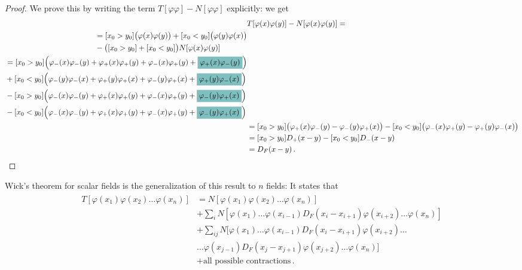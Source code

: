 \documentclass[main.tex]{subfiles}
\begin{document}
\begin{proof}
We prove this by writing the term \(T[\varphi \varphi ] - N[ \varphi \varphi ]\) explicitly: we get 
%
\begin{align}
& T[\varphi (x)\varphi (y)] - N[\varphi (x) \varphi (y)] = \\
\begin{split}
&= [x_0 > y_0 ] \qty(\varphi (x) \varphi (y)) + [x_0 < y_0 ] \qty(\varphi (y) \varphi (x)) \\
& 
- \qty([x_0 > y_0 ] + [x_0 < y_0 ]) N [\varphi (x)\varphi (y)] 
\end{split}  \\
\begin{split}
&= 
[x_0 > y_0 ] \qty(\varphi_{-} (x) \varphi_{-} (y) + \varphi_{+} (x) \varphi_{+} (y) + \varphi_{-} (x) \varphi_{+} (y) + \hlc{teal}{\varphi_{+} (x) \varphi_{-} (y)}) \\
& 
+ 
[x_0 < y_0 ] \qty(\varphi_{-} (y) \varphi_{-} (x) + \varphi_{+} (y) \varphi_{+} (x) + \varphi_{-} (y) \varphi_{+} (x) + \hlc{teal}{\varphi_{+} (y) \varphi_{-} (x)}) 
\\
& 
-
[x_0 > y_0 ]
\qty(\varphi_{-} (x) \varphi_{-} (y) + \varphi_{+} (x) \varphi_{+} (y) + \varphi_{-} (x) \varphi_{+} (y) + \hlc{teal}{\varphi_{-} (y) \varphi_{+} (x)} ) 
\\
& 
-
[x_0 < y_0 ]
\qty(\varphi_{-} (x) \varphi_{-} (y) + \varphi_{+} (x) \varphi_{+} (y) + \varphi_{-} (x) \varphi_{+} (y) + \hlc{teal}{\varphi_{-} (y) \varphi_{+} (x)} ) 
\end{split}  \\
&= [x_0 > y_0 ] \qty(\varphi_{+} (x) \varphi_{-} (y) - \varphi_{-} (y) \varphi_{+} (x))
- [x_0 < y_0 ] \qty(\varphi_{-} (x) \varphi_{+} (y) - \varphi_{+}(y) \varphi_{-}(x))  \\
&= 
[x_0 > y_0 ]
D_+ (x-y)
-
[x_0 < y_0 ]
D_- (x-y) \\
&= D_F (x-y)
\,.
\end{align}
\end{proof}

Wick's theorem for scalar fields is the generalization of this result to \(n\) fields: 
It states that 
%
\begin{align}
\begin{split}
T [\varphi (x_1 ) \varphi (x_2 ) \dots \varphi (x_n)]
&=
N [\varphi (x_1 ) \varphi (x_2 )\dots \varphi (x_n)] \\
&+ \sum_{i} N[\varphi (x_1 )\dots \varphi (x_{i-1}) D_F (x_i- x_{i+1}) \varphi (x_{i+2}) \dots \varphi (x_n)]  \\
&+ \sum _{ij}
N[\varphi (x_1 )\dots \varphi (x_{i-1}) D_F (x_i- x_{i+1}) \varphi (x_{i+2}) \dots \\
& \dots \varphi (x_{j-1}) D_F (x_j- x_{j+1}) \varphi (x_{j+2}) \dots \varphi (x_n)]  \\
&+ \text{all possible contractions}
\,.
\end{split}
\end{align}
\end{document}
